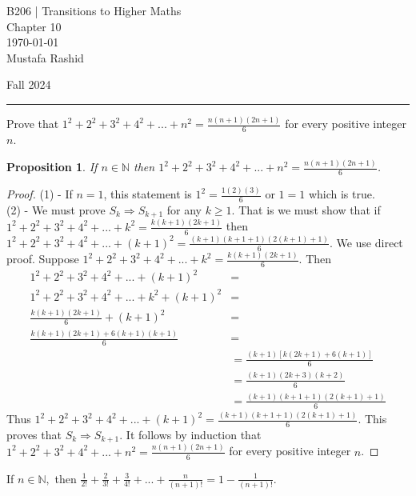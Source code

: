 \documentclass[12pt,letterpaper, onecolumn]{exam}
\newtheorem*{prop}{Proposition}
\begin{document}
	\begingroup  
	\noindent\LARGE B206 | Transitions to Higher Maths\\
	\noindent\LARGE Chapter 10\\
	\noindent\large \today\\
	\noindent\large Mustafa Rashid\par
	\noindent\large Fall 2024\par
	\endgroup
	\rule{\textwidth}{0.4pt}
	\pointsdroppedatright
	\printanswers
	\renewcommand{\solutiontitle}{\noindent\textbf{Ans:}\enspace}  
	\begin{questions}
			\setcounter{question}{1}\question Prove that $1^2+2^2+3^2+4^2+...+n^2=\frac{n(n+1)(2n+1)}{6}$ for every positive integer $n$.
			\begin{solution}
				\begin{prop}
					If $n\in\mathbb{N}$ then  $1^2+2^2+3^2+4^2+...+n^2=\frac{n(n+1)(2n+1)}{6}$.
					\end{prop}
					\begin{proof}
					(1) - If $n=1$, this statement is $1^2=\frac{1(2)(3)}{6}$ or $1=1$ which is true.\\
					(2) - We must prove $S_k\Rightarrow S_{k+1}$ for any $k\geq1$. That is we must show that if $1^2+2^2+3^2+4^2+...+k^2=\frac{k(k+1)(2k+1)}{6}$ then $1^2+2^2+3^2+4^2+...+(k+1)^2=\frac{(k+1)(k+1+1)(2(k+1)+1)}{6}$. We use direct proof. Suppose $1^2+2^2+3^2+4^2+...+k^2=\frac{k(k+1)(2k+1)}{6}$. Then
					\begin{align*}
						1^2+2^2+3^2+4^2+...+(k+1)^2&=\\
						1^2+2^2+3^2+4^2+...+k^2+(k+1)^2&=\\
						\frac{k(k+1)(2k+1)}{6}+(k+1)^2&=\\
						\frac{k(k+1)(2k+1)+6(k+1)(k+1)}{6}&=\\
						&=\frac{(k+1)\left[k(2k+1)+6(k+1)\right]}{6}\\
						&=\frac{(k+1)(2k+3)(k+2)}{6}\\
						&=\frac{(k+1)(k+1+1)(2(k+1)+1)}{6}
					\end{align*}
					Thus $1^2+2^2+3^2+4^2+...+(k+1)^2=\frac{(k+1)(k+1+1)(2(k+1)+1)}{6}$. This proves that $S_k\Rightarrow S_{k+1}$. It follows by induction that $1^2+2^2+3^2+4^2+...+n^2=\frac{n(n+1)(2n+1)}{6}$ for every positive integer $n$.
					\end{proof}
			\end{solution}
			\pagebreak
			\setcounter{question}{7}\question If $n\in\mathbb{N},$ then $\frac{1}{2!}+\frac{2}{3!}+\frac{3}{4!}+...+\frac{n}{(n+1)!}=1-\frac{1}{(n+1)!}$.

\end{questions}
\end{document}
